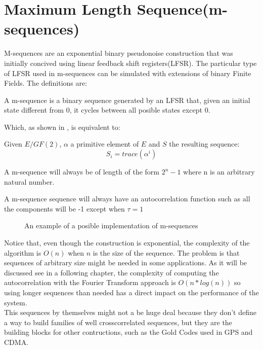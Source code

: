 \section{Maximum Length Sequence(m-sequences)}

M-sequences are an exponential binary pseudonoise construction that was
initially concived using linear feedback shift registers(LFSR). The particular
type of LFSR used in m-sequences can be simulated with extensions of binary
Finite Fields. The definitions are:

\begin{definition}[LFSR]
  A m-sequence is a binary sequence generated by an LFSR that, given an initial
  state different from 0, it cycles between all posible states except 0.
\end{definition}

Which, as shown in \citet{golomb_ref}, is equivalent to:

\begin{definition}
  Given $E/GF(2)$, $\alpha$ a primitive element of $E$ and $S$ the resulting
  sequence:
  \begin{equation}
    S_{i} = trace(\alpha^{i})
  \end{equation}
\end{definition}

\begin{property}
  A m-sequence will always be of length of the form $2^{n}-1$ where n is an
  arbitrary natural number.
\end{property}

\begin{property}
  A m-sequence sequence will always have an autocorrelation function such as
  all the components will be -1 except when $\tau = 1$
\end{property}

\begin{figure}[ht!]
  \caption{An example of a posible implementation of m-sequences}
  \label{mls:fig:1}
\end{figure}

Notice that, even though the construction is exponential, the complexity of
the algorithm is $O(n)$ when $n$ is the size of the sequence. The problem is
that sequences of arbitrary size might be needed in some applications. As it will
be discussed see in a following chapter, the complexity of computing the
autocorrelation with the Fourier Transform approach is $O(n*log(n))$ so using longer
sequences than needed has a direct impact on the performance of the system. \\

This sequences by themselves might not a be huge deal because they don't define
a way to build families of well crosscorrelated sequences, but they are the
building blocks for other contructions, such as the Gold Codes used in GPS and
CDMA.
